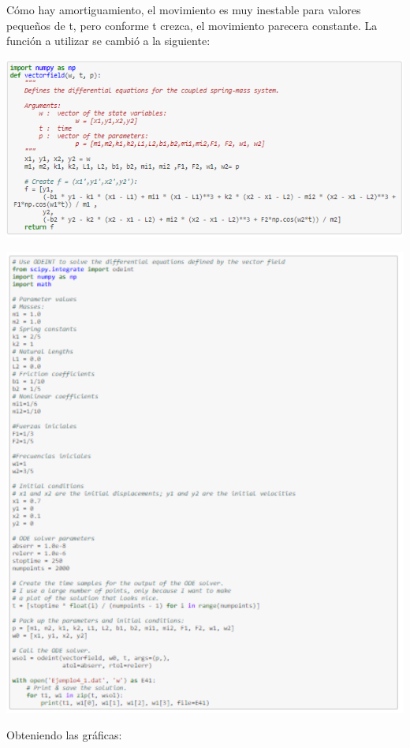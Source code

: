 \documentclass{article}
\begin{document}
Cómo hay amortiguamiento, el movimiento es muy inestable para valores pequeños de t, pero conforme t crezca, el movimiento parecera constante. La función a utilizar se cambió a la siguiente:
\begin{center}
    \includegraphics[width=.9\textwidth]{Fun4.PNG}
\end{center}
\begin{center}
    \includegraphics[width=1\textwidth]{Datos4_1.PNG}
\end{center}
Obteniendo las gráficas:
\end{document}
